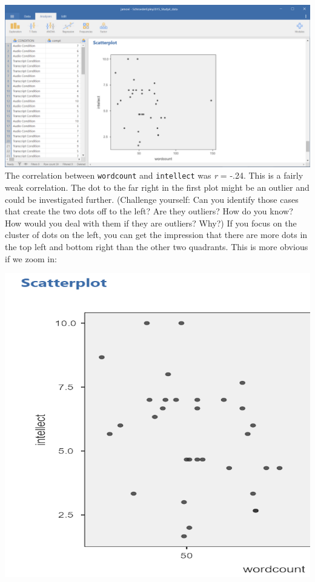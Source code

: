 \documentclass[
]{book}
\begin{document}
\includegraphics{img/7.4.71.png}
The correlation between \texttt{wordcount} and \texttt{intellect} was \emph{r} = -.24. This is a fairly weak correlation. The dot to the far right in the first plot might be an outlier and could be investigated further. (Challenge yourself: Can you identify those cases that create the two dots off to the left? Are they outliers? How do you know? How would you deal with them if they are outliers? Why?) If you focus on the cluster of dots on the left, you can get the impression that there are more dots in the top left and bottom right than the other two quadrants. This is more obvious if we zoom in:

\includegraphics{img/7.4.71 zoomed in.png}
\end{document}
